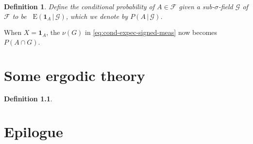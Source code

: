 \documentclass[10pt]{book}
\numberwithin{equation}{chapter}
\theoremstyle{plain-star}
\theoremstyle{definition-star}
\newtheorem{defn}[equation]{Definition}
\theoremstyle{remark-star}
\theoremstyle{plain-star}
\newcommand{\ind}{\mathbf{1}}
\newcommand{\E}{\mathop{}\!\mathrm{E}}
\newcommand{\giv}{\,|\,}
\newcommand{\F}{\mathcal{F}}
\newcommand{\G}{\mathcal{G}}
\begin{document}
\begin{defn}
    Define the conditional probability of $A \in \F$ given a sub-$\sigma$-field $\G$ of $\F$ to be $\E(\ind_A \giv \G)$, which we denote by $P(A\giv \G)$.
\end{defn}

When $X = \ind_A$, the $\nu(G)$ in \eqref{eq:cond-expec-signed-meas} now becomes $P(A\cap G)$. %

\chapter{Some ergodic theory}
\begin{defn}
    
\end{defn}

\newpage
{}
{}
\chapter*{\Large Epilogue}

\newpage
{}
\printbibliography

\newpage
{}
{}
\printindex
\end{document}
